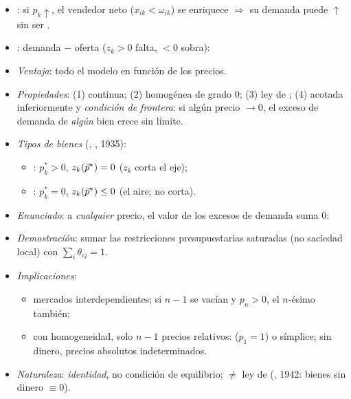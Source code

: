 \documentclass{article}
\begin{document}
\begin{columnas}
\begin{itemize}
\item {}: si $p_k\uparrow$, el vendedor neto ($x_{ik}<\omega_{ik}$) se enriquece $\Rightarrow$ su demanda puede $\uparrow$ sin ser .
\end{itemize}
\begin{itemize}
\item {}: demanda $-$ oferta ($z_k>0$ falta, $<0$ sobra):
\item \emph{Ventaja}: todo el modelo en función de los precios.
\item \emph{Propiedades}: (1) continua; (2) homogénea de grado 0; (3) ley de ; (4) acotada inferiormente y \emph{condición de frontera}: si algún precio $\to0$, el exceso de demanda de \emph{algún} bien crece sin límite.
\item \emph{Tipos de bienes} (, , 1935):
  \begin{itemize}
  \item {}: $p^*_k>0$, $z_k(\vec{p}^*)=0$ ($z_k$ corta el eje);
  \item {}: $p^*_k=0$, $z_k(\vec{p}^*)\leq0$ (el aire; no corta).
  \end{itemize}
\end{itemize}
\begin{itemize}
\item \emph{Enunciado}: a \emph{cualquier} precio, el valor de los excesos de demanda suma 0:
\item \emph{Demostración}: sumar las restricciones presupuestarias saturadas (no saciedad local) con $\sum_i\theta_{ij}=1$.\findemo
\item \emph{Implicaciones}:
  \begin{itemize}
  \item mercados interdependientes; si $n-1$ se vacían y $p_n>0$, el $n$-ésimo también;
  \item con homogeneidad, solo $n-1$ precios relativos:  ($p_1=1$) o símplice; sin dinero, precios absolutos indeterminados.
  \end{itemize}
\item \emph{Naturaleza}: \emph{identidad}, no condición de equilibrio; $\neq$ ley de  (, 1942: bienes sin dinero $\equiv0$).
\end{itemize}


\end{columnas}
\end{document}
